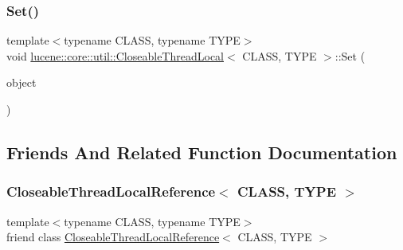 \subsubsection{\texorpdfstring{Set()}{Set()}\hspace{0.1cm}{\footnotesize\ttfamily [2/2]}}
{\footnotesize\ttfamily template$<$typename C\+L\+A\+SS, typename T\+Y\+PE$>$ \\
void \mbox{\hyperlink{classlucene_1_1core_1_1util_1_1CloseableThreadLocal}{lucene\+::core\+::util\+::\+Closeable\+Thread\+Local}}$<$ C\+L\+A\+SS, T\+Y\+PE $>$\+::Set (\begin{DoxyParamCaption}\item[{T\+Y\+PE \&\&}]{object }\end{DoxyParamCaption})\hspace{0.3cm}{\ttfamily [inline]}}



\subsection{Friends And Related Function Documentation}
\mbox{\label{classlucene_1_1core_1_1util_1_1CloseableThreadLocal_aa92c52d6e0ef7dba63e0ed7a8ef763cb}} 
\subsubsection{\texorpdfstring{Closeable\+Thread\+Local\+Reference$<$ C\+L\+A\+S\+S, T\+Y\+P\+E $>$}{CloseableThreadLocalReference< CLASS, TYPE >}}
{\footnotesize\ttfamily template$<$typename C\+L\+A\+SS, typename T\+Y\+PE$>$ \\
friend class \mbox{\hyperlink{classlucene_1_1core_1_1util_1_1CloseableThreadLocalReference}{Closeable\+Thread\+Local\+Reference}}$<$ C\+L\+A\+SS, T\+Y\+PE $>$\hspace{0.3cm}{\ttfamily [friend]}}



